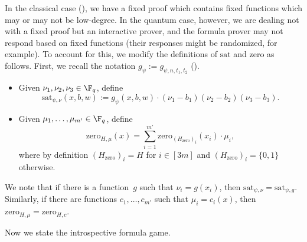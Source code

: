 \documentclass[11pt]{article}
\begin{document}
\begin{notation}\label{not:annoying-technicality}
In the classical case (),
we have a fixed proof which contains fixed functions which may or may not be low-degree.
In the quantum case, however, we are dealing not with a fixed proof but an interactive prover,
and the formula prover may not respond based on fixed functions (their responses might be randomized, for example).
To account for this, we modify the definitions of $\mathrm{sat}$ and $\mathrm{zero}$ as follows.
First, we recall the notation $g_\psi := g_{\psi, n, t_1, t_2}$ (). 
\begin{itemize}
	\item[$\circ$] Given $\nu_1, \nu_2, \nu_3 \in \F_q$, define
		\begin{equation*}
			\mathrm{sat}_{\psi, \nu}(x, b, w) := g_{\psi}(x, b, w) \cdot (\nu_1 - b_1) (\nu_2 - b_2) (\nu_3 - b_3).
		\end{equation*}
	\item[$\circ$] Given $\mu_1, \ldots, \mu_{m'} \in \F_q$, define
		\begin{equation*}
			\mathrm{zero}_{H, \mu}(x) = \sum_{i=1}^{m'} \mathrm{zero}_{(H_{\mathrm{zero}})_i}(x_i) \cdot \mu_i,
		\end{equation*}
		where by definition $(H_{\mathrm{zero}})_i = H$ for $i \in [3m]$ and $(H_{\mathrm{zero}})_i = \{0, 1\}$ otherwise.
\end{itemize}
We note that if there is a function~$g$ such that $\nu_i = g(x_i)$, then $\mathrm{sat}_{\psi, \nu} = \mathrm{sat}_{\psi, g}$.
Similarly, if there are functions $c_1, \ldots, c_{m'}$ such that $\mu_i = c_i(x)$, then $\mathrm{zero}_{H, \mu} = \mathrm{zero}_{H, c}$.
\end{notation}

Now we state the introspective formula game.
\end{document}
